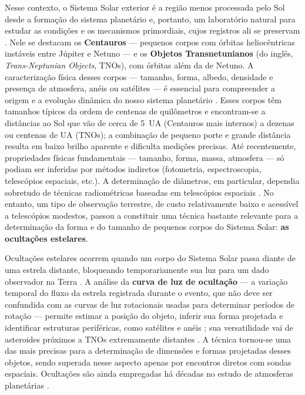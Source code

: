 Nesse contexto, o Sistema Solar exterior é a região menos processada pelo Sol desde a formação do sistema planetário e, portanto, um laboratório natural para estudar as condições e os mecanismos primordiais, cujos registros ali se preservam \citep{Morbidelli2024, Tsiganis2009}. Nele se destacam os \textbf{Centauros} --- pequenos corpos com órbitas heliocêntricas instáveis entre Júpiter e Netuno --- e os \textbf{Objetos Transnetunianos} (do inglês, \textit{Trans-Neptunian Objects}, TNOs), com órbitas além da de Netuno. A caracterização física desses corpos --- tamanho, forma, albedo, densidade e presença de atmosfera, anéis ou satélites --- é essencial para compreender a origem e a evolução dinâmica do nosso sistema planetário \citep{Ortiz2020}. Esses corpos têm tamanhos típicos da ordem de centenas de quilômetros e encontram-se a distâncias ao Sol que vão de cerca de 5~UA (Centauros mais internos) a dezenas ou centenas de UA (TNOs); a combinação de pequeno porte e grande distância resulta em baixo brilho aparente e dificulta medições precisas. Até recentemente, propriedades físicas fundamentais --- tamanho, forma, massa, atmosfera --- só podiam ser inferidas por métodos indiretos (fotometria, espectroscopia, telescópios espaciais, etc.). A determinação de diâmetros, em particular, dependia sobretudo de técnicas radiométricas baseadas em telescópios espaciais
\citep{Fornasier2013}. No entanto, um tipo de observação terrestre, de custo relativamente baixo e acessível a telescópios modestos, passou a constituir uma técnica bastante relevante para a determinação da forma e do tamanho de pequenos corpos do Sistema Solar: \textbf{as ocultações estelares}.

Ocultações estelares ocorrem quando um corpo do Sistema Solar passa diante de uma estrela distante, bloqueando temporariamente sua luz para um dado observador na Terra \citep{Ortiz2020, Knieling2024}. A análise da \textbf{curva de luz de ocultação} --- a variação temporal do fluxo da estrela registrada durante o evento, que não deve ser confundida com as curvas de luz rotacionais usadas para determinar períodos de rotação --- permite estimar a posição do objeto, inferir sua forma projetada e identificar estruturas periféricas, como satélites e anéis \citep{Cazeneuve2023}; sua versatilidade vai de asteroides próximos a TNOs extremamente distantes \citep{Fraser2024}. A técnica tornou-se uma das mais precisas para a determinação de dimensões e formas projetadas desses objetos, sendo superada nesse aspecto apenas por encontros diretos com sondas espaciais. Ocultações são ainda empregadas há décadas no estudo de atmosferas planetárias \citep{Zhu2022}. 

